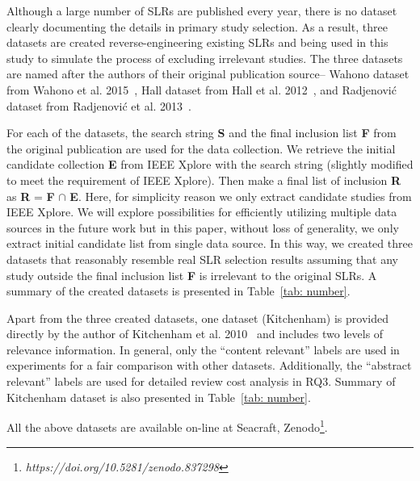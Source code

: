 \documentclass{svjour3}
\theoremstyle{break}
\begin{document}
Although a large number of SLRs are published every year, there is no dataset clearly documenting the details in primary study selection. As a result, three datasets are created reverse-engineering existing SLRs and being used in this study to simulate the process of excluding irrelevant studies. The three datasets are named after the authors of their original publication source-- Wahono dataset from Wahono et al. 2015~\cite{wahono2015systematic}, Hall dataset from Hall et al. 2012~\cite{hall2012systematic}, and Radjenovi{\'c} dataset from Radjenovi{\'c} et al. 2013~\cite{radjenovic2013software}. 

For each of the datasets, the search string \textbf{S} and the final inclusion list \textbf{F} from the original publication are used for the data collection. We retrieve the initial candidate collection \textbf{E} from IEEE Xplore with the search string (slightly modified to meet the requirement of IEEE Xplore). Then make a final list of inclusion \textbf{R} as \textbf{R} = \textbf{F} $\cap$ \textbf{E}. Here, for simplicity reason we only extract candidate studies from IEEE Xplore. We will explore possibilities for efficiently utilizing multiple data sources in the future work but in this paper, without loss of generality, we only extract initial candidate list from single data source. In this way, we created three datasets that reasonably resemble real SLR selection results assuming that any study outside the final inclusion list \textbf{F} is irrelevant to the original SLRs. A summary of the created datasets is presented in Table~\ref{tab: number}.

Apart from the three created datasets, one dataset (Kitchenham) is provided directly by the author of Kitchenham et al. 2010~\cite{kitchenham2010systematic} and includes two levels of relevance information. In general, only the ``content relevant'' labels are used in experiments for a fair comparison with other datasets. Additionally, the ``abstract relevant'' labels are used for detailed review cost analysis in RQ3. Summary of Kitchenham dataset is also presented in Table~\ref{tab: number}.

All the above datasets are available on-line at Seacraft, Zenodo\footnote{\em https://doi.org/10.5281/zenodo.837298}.
\end{document}
